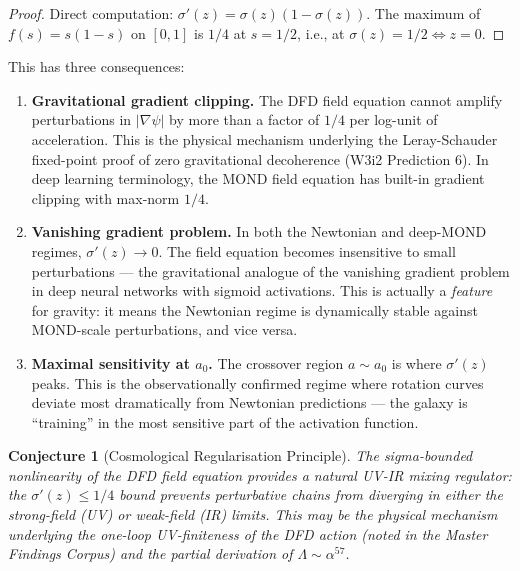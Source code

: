 \documentclass[11pt]{article}
\newtheorem{conjecture}[theorem]{Conjecture}
\theoremstyle{definition}
\theoremstyle{remark}
\begin{document}
\begin{proof}
Direct computation: $\sigma'(z) = \sigma(z)(1-\sigma(z))$. The maximum
of $f(s) = s(1-s)$ on $[0,1]$ is $1/4$ at $s = 1/2$, i.e., at
$\sigma(z) = 1/2 \Leftrightarrow z = 0$.
\end{proof}

This has three consequences:

\begin{enumerate}
\item \textbf{Gravitational gradient clipping.} The DFD field equation
  cannot amplify perturbations in $|\nabla\psi|$ by more than a factor
  of $1/4$ per log-unit of acceleration. This is the physical mechanism
  underlying the Leray-Schauder fixed-point proof of zero gravitational
  decoherence (W3i2 Prediction 6). In deep learning terminology, the
  MOND field equation has built-in gradient clipping with max-norm
  $1/4$.

\item \textbf{Vanishing gradient problem.} In both the Newtonian and
  deep-MOND regimes, $\sigma'(z) \to 0$. The field equation becomes
  insensitive to small perturbations --- the gravitational analogue of
  the vanishing gradient problem in deep neural networks with sigmoid
  activations. This is actually a \emph{feature} for gravity: it means
  the Newtonian regime is dynamically stable against MOND-scale
  perturbations, and vice versa.

\item \textbf{Maximal sensitivity at $a_0$.} The crossover region
  $a \sim a_0$ is where $\sigma'(z)$ peaks. This is the observationally
  confirmed regime where rotation curves deviate most dramatically from
  Newtonian predictions --- the galaxy is ``training'' in the most
  sensitive part of the activation function.
\end{enumerate}

\begin{conjecture}[Cosmological Regularisation Principle]
\label{conj:cosmo-regularisation}
The sigma-bounded nonlinearity of the DFD field equation provides a
natural UV-IR mixing regulator: the $\sigma'(z) \leq 1/4$ bound
prevents perturbative chains from diverging in either the
strong-field (UV) or weak-field (IR) limits. This may be the physical
mechanism underlying the one-loop UV-finiteness of the DFD action
(noted in the Master Findings Corpus) and the partial derivation of
$\Lambda \sim \alpha^{57}$.
\end{conjecture}

\end{document}
